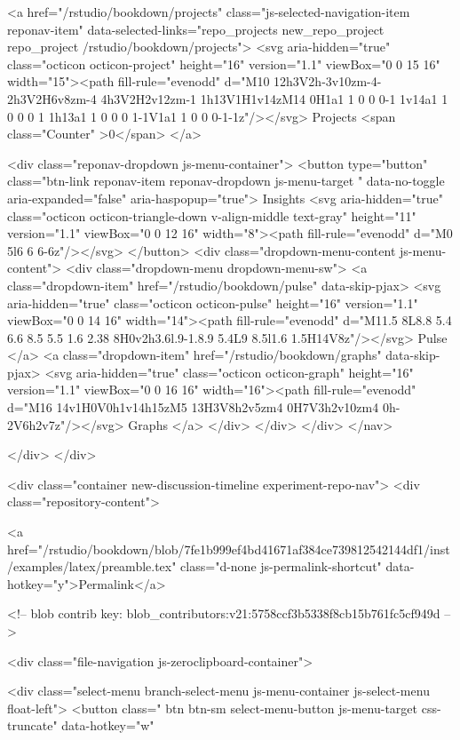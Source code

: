     <a href="/rstudio/bookdown/projects" class="js-selected-navigation-item reponav-item" data-selected-links="repo_projects new_repo_project repo_project /rstudio/bookdown/projects">
      <svg aria-hidden="true" class="octicon octicon-project" height="16" version="1.1" viewBox="0 0 15 16" width="15"><path fill-rule="evenodd" d="M10 12h3V2h-3v10zm-4-2h3V2H6v8zm-4 4h3V2H2v12zm-1 1h13V1H1v14zM14 0H1a1 1 0 0 0-1 1v14a1 1 0 0 0 1 1h13a1 1 0 0 0 1-1V1a1 1 0 0 0-1-1z"/></svg>
      Projects
      <span class="Counter" >0</span>
</a>


    <div class="reponav-dropdown js-menu-container">
      <button type="button" class="btn-link reponav-item reponav-dropdown js-menu-target " data-no-toggle aria-expanded="false" aria-haspopup="true">
        Insights
        <svg aria-hidden="true" class="octicon octicon-triangle-down v-align-middle text-gray" height="11" version="1.1" viewBox="0 0 12 16" width="8"><path fill-rule="evenodd" d="M0 5l6 6 6-6z"/></svg>
      </button>
      <div class="dropdown-menu-content js-menu-content">
        <div class="dropdown-menu dropdown-menu-sw">
          <a class="dropdown-item" href="/rstudio/bookdown/pulse" data-skip-pjax>
            <svg aria-hidden="true" class="octicon octicon-pulse" height="16" version="1.1" viewBox="0 0 14 16" width="14"><path fill-rule="evenodd" d="M11.5 8L8.8 5.4 6.6 8.5 5.5 1.6 2.38 8H0v2h3.6l.9-1.8.9 5.4L9 8.5l1.6 1.5H14V8z"/></svg>
            Pulse
          </a>
          <a class="dropdown-item" href="/rstudio/bookdown/graphs" data-skip-pjax>
            <svg aria-hidden="true" class="octicon octicon-graph" height="16" version="1.1" viewBox="0 0 16 16" width="16"><path fill-rule="evenodd" d="M16 14v1H0V0h1v14h15zM5 13H3V8h2v5zm4 0H7V3h2v10zm4 0h-2V6h2v7z"/></svg>
            Graphs
          </a>
        </div>
      </div>
    </div>
</nav>

      </div>
    </div>

<div class="container new-discussion-timeline experiment-repo-nav">
  <div class="repository-content">

    
  <a href="/rstudio/bookdown/blob/7fe1b999ef4bd41671af384ce739812542144df1/inst/examples/latex/preamble.tex" class="d-none js-permalink-shortcut" data-hotkey="y">Permalink</a>

  <!-- blob contrib key: blob_contributors:v21:5758ccf3b5338f8cb15b761fc5cf949d -->

  <div class="file-navigation js-zeroclipboard-container">
    
<div class="select-menu branch-select-menu js-menu-container js-select-menu float-left">
  <button class=" btn btn-sm select-menu-button js-menu-target css-truncate" data-hotkey="w"
    
